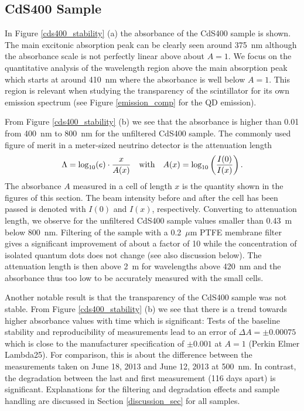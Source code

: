 \documentclass[cits]{JINST}
\begin{document}
\subsection{CdS400 Sample}
In Figure \ref{cds400_stability} (a) the absorbance of the CdS400 sample is shown. The main excitonic absorption peak can be clearly seen around 375~nm although the absorbance scale is not perfectly linear above about $A=1$. We focus on the quantitative analysis of the wavelength region above the main absorption peak which starts at around 410~nm where the absorbance is well below $A=1$. This region is relevant when studying the transparency of the scintillator for its own emission spectrum (see Figure \ref{emission_comp} for the QD emission). 

From Figure \ref{cds400_stability} (b) we see that the absorbance is higher than 0.01 from 400~nm to 800~nm for the unfiltered CdS400 sample. The commonly used figure of merit in a meter-sized neutrino detector is the attenuation length
\begin{equation}
\Lambda = \textnormal{log}_{10}(e) \cdot \frac{x}{A(x)} \quad \textnormal{with} \quad A(x) = \textnormal{log}_{10} \left( \frac{I(0)}{I(x)} \right).   
\end{equation}  
The absorbance $A$ measured in a cell of length $x$ is the quantity shown in the figures of this section. The beam intensity before and after the cell has been passed is denoted with $I(0)$ and $I(x)$, respectively. Converting to attenuation length, we observe for the unfiltered CdS400 sample values smaller than 0.43~m below 800~nm. Filtering of the sample with a 0.2~$\mu$m PTFE membrane filter gives a significant improvement of about a factor of 10 while the concentration of isolated quantum dots does not change (see also discussion below). The attenuation length is then above 2~m for wavelengths above 420~nm and the absorbance thus too low to be accurately measured with the small cells. 
 
Another notable result is that the transparency of the CdS400 sample was not stable. From Figure \ref{cds400_stability} (b) we see that there is a trend towards higher absorbance values with time which is significant: Tests of the baseline stability and reproducibility of measurements lead to an error of $\Delta A = \pm 0.00075$ which is close to the manufacturer specification of $\pm 0.001$ at $A=1$ (Perkin Elmer Lambda25). For comparison, this is about the difference between the measurements taken on June 18, 2013 and June 12, 2013 at 500~nm. In contrast, the degradation between the last and first measurement (116 days apart) is significant. Explanations for the filtering and degradation effects and sample handling are discussed in Section \ref{discussion_sec} for all samples.  
\end{document}
